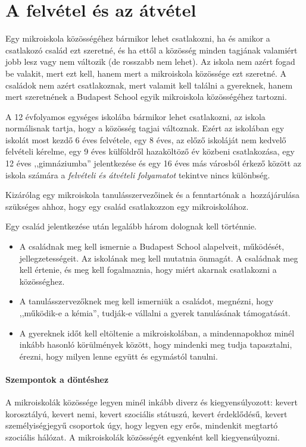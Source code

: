 \section{A felvétel és az átvétel}
\label{sec:felvetel-atvetel}
Egy mikroiskola közösségéhez bármikor lehet csatlakozni, ha és amikor a
csatlakozó
család ezt szeretné, és ha ettől a közösség minden tagjának valamiért  jobb
lesz vagy nem változik (de rosszabb nem lehet).
Az iskola nem azért fogad be valakit, mert
ezt kell, hanem mert a mikroiskola közössége ezt szeretné.
A családok nem azért csatlakoznak, mert valamit kell találni a gyereknek, hanem
mert
szeretnének a Budapest School egyik mikroiskola közösségéhez tartozni.

A 12 évfolyamos egységes iskolába bármikor lehet csatlakozni, az iskola
normálisnak tartja, hogy a közösség tagjai változnak.
Ezért az iskolában egy iskolát most kezdő 6 éves felvétele, egy 8 éves, az előző
iskoláját nem kedvelő felvételi kérelme, egy 9 éves
külföldről hazaköltöző év közbeni csatlakozása, egy 12 éves ,,gimnáziumba''
jelentkezése és egy 16 éves más városból érkező  között az iskola
számára
a \emph{felvételi és átvételi folyamatot} tekintve nincs különbség.

Kizárólag egy mikroiskola tanulásszervezőinek és a fenntartónak
a\
hozzájárulása
szükséges ahhoz, hogy
egy család csatlakozzon egy mikroiskolához.

Egy család jelentkezése után legalább három dolognak kell történnie.
\begin{itemize}
      \item A családnak meg kell ismernie a Budapest School alapelveit,
            működését, jellegzetességeit. Az iskolának meg kell mutatnia
            önmagát. A
            családnak meg kell értenie,  és meg kell fogalmaznia, hogy miért
            akarnak
            csatlakozni a közösséghez.
      \item A tanulásszervezőknek meg kell ismerniük a családot, megnézni, hogy
            ,,működik-e a kémia'', tudják-e vállalni a gyerek tanulásának
            támogatását.
      \item A gyereknek időt kell eltöltenie a mikroiskolában, a mindennapokhoz
            minél inkább hasonló körülmények között, hogy mindenki meg tudja
            tapasztalni,
            érezni, hogy milyen lenne együtt és egymástól tanulni.
\end{itemize}

\paragraph{Szempontok a döntéshez}
A mikroiskolák közössége legyen minél inkább diverz és kiegyensúlyozott: kevert
korosztályú, kevert nemi, kevert szociális státuszú, kevert
érdeklődésű, kevert személyiségjegyű csoportok úgy, hogy legyen egy erős,
mindenkit megtartó szociális
hálózat. A mikroiskolák közösségét egyenként kell kiegyensúlyozni.%

